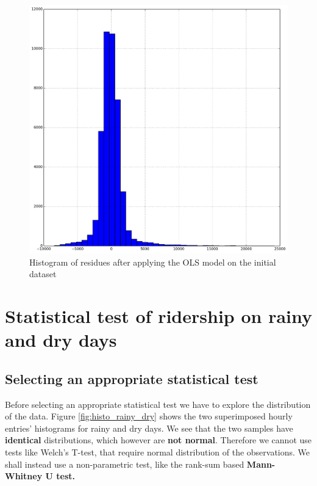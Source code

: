 \documentclass{article}
\begin{document}
\begin{figure}[ht]
\centering
\includegraphics[scale=0.6]{residues.png}
\caption{Histogram of residues after applying the OLS model on the initial dataset}
\label{fig:residues}
\end{figure}

\section{Statistical test of ridership on rainy and dry days}

\subsection{Selecting an appropriate statistical test}
Before selecting an appropriate statistical test we have to explore the distribution of the data. Figure \ref{fig:histo_rainy_dry} shows the two superimposed hourly entries' histograms for rainy and dry days. We see that the two samples have \textbf{identical} distributions, which however are \textbf{not normal}. Therefore we cannot use tests like Welch's T-test, that require normal distribution of the observations. We shall instead use a non-parametric test, like the rank-sum based \textbf{Mann-Whitney U test.}
\end{document}
